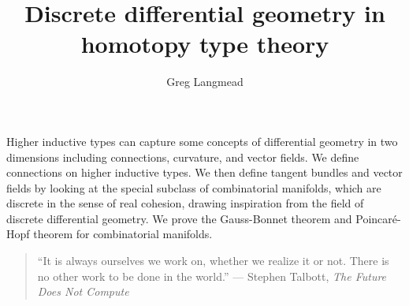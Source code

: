 \documentclass[12pt,fleqn]{article}
\title{Discrete differential geometry in homotopy type theory}
\author{Greg Langmead}
\renewenvironment{abstract}{\section*{\abstractname}}{}
\begin{document}
\maketitle

\begin{abstract}
Higher inductive types can capture some concepts of differential geometry in two dimensions including connections, curvature, and vector fields. We define connections on higher inductive types. We then define tangent bundles and vector fields by looking at the special subclass of combinatorial manifolds, which are discrete in the sense of real cohesion\cite{shulman_cohesion}, drawing inspiration from the field of discrete differential geometry. We prove the Gauss-Bonnet theorem and Poincaré-Hopf theorem for combinatorial manifolds.
\end{abstract}

\begin{quote} 
\centering
``It is always ourselves we work on, whether we realize it or not. There is no other work to be done in the world.'' --- Stephen Talbott, \emph{The Future Does Not Compute}\cite{talbott}
\end{quote}

\listofchanges[title=Changelist]
\listoftodos
\end{document}
